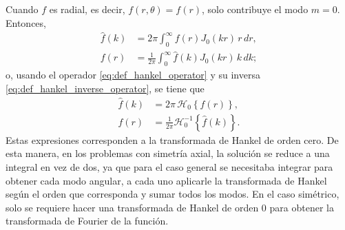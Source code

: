 Cuando $f$ es radial, es decir, $f(r,\theta)=f(r)$, solo contribuye el modo $m=0$. Entonces,
\begin{align}
  \hat f(k)&=2\pi\int_0^\infty f(r)J_0(kr)\,r\,dr,
  \label{eq:hankel_orden_cero_directa}\\
  f(r)&=\frac{1}{2\pi}\int_0^\infty \hat f(k)J_0(kr)\,k\,dk;
  \label{eq:hankel_orden_cero_inversa}
\end{align}
o, usando el operador \eqref{eq:def_hankel_operator} y su inversa \eqref{eq:def_hankel_inverse_operator}, se tiene que
\begin{align}
  \hat f(k) &= 2\pi \, \mathscr H_0 \left\{ f(r) \right\}, \\
  f(r)      &= \frac{1}{2\pi} \mathscr H_0^{-1} \left\{  \hat f(k) \right\}.
\end{align}
Estas expresiones corresponden a la transformada de Hankel de orden cero. De esta manera, en los problemas con simetría axial, la solución se reduce a una integral en vez de dos, ya que para el caso general se necesitaba integrar para obtener cada modo angular, a cada uno aplicarle la transformada de Hankel según el orden que corresponda y sumar todos los modos. En el caso simétrico, solo se requiere hacer una transformada de Hankel de orden 0 para obtener la transformada de Fourier de la función.
